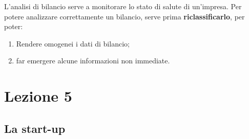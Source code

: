 \documentclass[14pt]{extarticle}
\begin{document}
L'analisi di bilancio serve a monitorare lo stato di salute di un'impresa. Per
potere analizzare correttamente un bilancio, serve prima
\textbf{riclassificarlo}, per poter:

\begin{enumerate}
    \item Rendere omogenei i dati di bilancio;
    \item far emergere alcune informazioni non immediate.
\end{enumerate}

\section{Lezione 5}

\subsection{La start-up}
\end{document}
